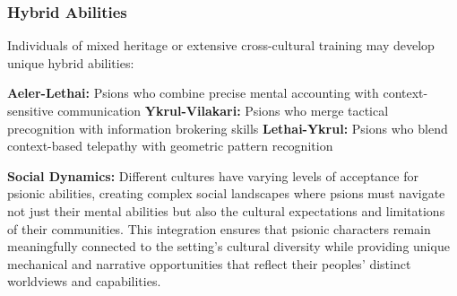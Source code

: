 \documentclass[11pt,twoside]{article}
\begin{document}
\subsubsection{Hybrid Abilities}
Individuals of mixed heritage or extensive cross-cultural training may develop unique hybrid abilities:
\begin{itemize}
    \textbf{Aeler-Lethai:} Psions who combine precise mental accounting with context-sensitive communication
    \textbf{Ykrul-Vilakari:} Psions who merge tactical precognition with information brokering skills
    \textbf{Lethai-Ykrul:} Psions who blend context-based telepathy with geometric pattern recognition
\end{itemize}

\textbf{Social Dynamics:} Different cultures have varying levels of acceptance for psionic abilities, creating complex social landscapes where psions must navigate not just their mental abilities but also the cultural expectations and limitations of their communities. This integration ensures that psionic characters remain meaningfully connected to the setting's cultural diversity while providing unique mechanical and narrative opportunities that reflect their peoples' distinct worldviews and capabilities.
\end{document}
